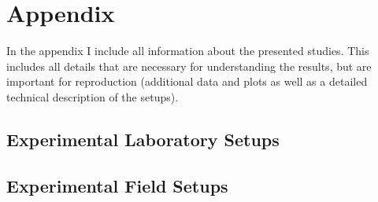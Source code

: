 \chapter{Appendix}\label{chap:appendix}\label{chap:appendix}
\begin{chapter-abstract}
In the appendix I include all information about the presented studies.
This includes all details that are necessary for understanding the results, but are important for reproduction (additional data and plots as well as a detailed technical description of the setups).
\end{chapter-abstract}


\section{Experimental Laboratory Setups}\label{appendix:laboratorySetups}

\section{Experimental Field Setups}